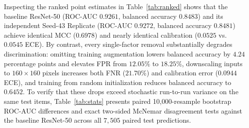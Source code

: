 \documentclass[final,5p,times,twocolumn,numafflabel]{elsarticle}
\begin{document}
Inspecting the ranked point estimates in Table~\ref{tab:ranked} shows that the baseline ResNet-50 (ROC-AUC $0.9261$, balanced accuracy $0.8483$) and its independent Seed-43 Replicate (ROC-AUC $0.9272$, balanced accuracy $0.8481$) achieve identical MCC ($0.6978$) and nearly identical calibration ($0.0525$ vs.\ $0.0545$ ECE). By contrast, every single-factor removal substantially degrades discrimination: omitting training augmentation lowers balanced accuracy by $4.24$ percentage points and elevates FPR from $12.05\%$ to $18.25\%$, downscaling inputs to $160\times 160$ pixels increases both FNR ($21.70\%$) and calibration error ($0.0944$ ECE), and training from random initialization reduces balanced accuracy to $0.6452$. To verify that these drops exceed stochastic run-to-run variance on the same test items, Table~\ref{tab:stats} presents paired 10,000-resample bootstrap ROC-AUC differences and exact two-sided McNemar disagreement tests against the baseline ResNet-50 across all $7{,}505$ paired test predictions.

\begin{table}[t]
\centering
\caption{Paired bootstrap ROC-AUC differences (10,000 resamples, seed 49) and exact McNemar tests relative to the baseline ResNet-50 ($n=7{,}505$).}
\label{tab:stats}
\footnotesize
\setlength{\tabcolsep}{5pt}
\renewcommand{\arraystretch}{1.15}
\end{table}
\end{document}
